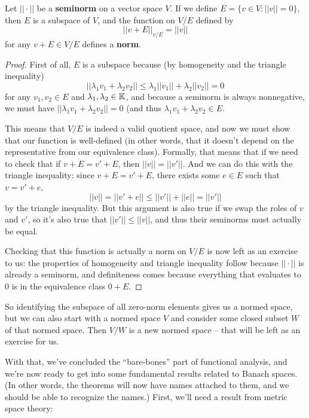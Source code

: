 \begin{theorem}
Let $||\cdot||$ be a \textbf{seminorm} on a vector space $V$. If we define $E = \{v \in V: ||v|| = 0\}$, then $E$ is a subspace of $V$, and the function on $V/E$ defined by
\[
    ||v+E||_{v/E} = ||v||
\]
for any $v + E \in V/E$ defines a \textbf{norm}. 
\end{theorem}
\begin{proof}
First of all, $E$ is a subspace because (by homogeneity and the triangle inequality)
\[
    ||\lambda_1 v_1 + \lambda_2 v_2 || \le \lambda_1 ||v_1|| + \lambda_2 ||v_2|| = 0
\]
for any $v_1, v_2 \in E$ and $\lambda_1, \lambda_2 \in \mathbb K$, and because a seminorm is always nonnegative, we must have $||\lambda_1v_1 + \lambda_2v_2|| = 0$ (and thus $\lambda_1 v_1 + \lambda_2 v_2 \in E$.

This means that $V/E$ is indeed a valid quotient space, and now we must show that our function is well-defined (in other words, that it doesn't depend on the representative from our equivalence class). Formally, that means that if we need to check that if $v + E = v' + E$, then $||v|| = ||v'||$. And we can do this with the triangle inequality: since $v + E = v' + E$, there exists some $e \in E$ such that $v = v' + e$, 
\[
    ||v|| = ||v' + e|| \le ||v'|| + ||e|| = ||v'||
\]
by the triangle inequality. But this argument is also true if we swap the roles of $v$ and $v'$, so it's also true that $||v'|| \le ||v||$, and thus their seminorms must actually be equal. 

Checking that this function is actually a norm on $V/E$ is now left as an exercise to us: the properties of homogeneity and triangle inequality follow because $||\cdot||$ is already a seminorm, and definiteness comes because everything that evaluates to $0$ is in the equivalence class $0 + E$.
\end{proof}

So identifying the subspace of all zero-norm elements gives us a normed space, but we can also start with a normed space $V$ and consider some closed subset $W$ of that normed space. Then $V/W$ is a new normed space -- that will be left as an exercise for us. 

With that, we've concluded the ``bare-bones'' part of functional analysis, and we're now ready to get into some fundamental results related to Banach spaces. (In other words, the theorems will now have names attached to them, and we should be able to recognize the names.) First, we'll need a result from metric space theory:

